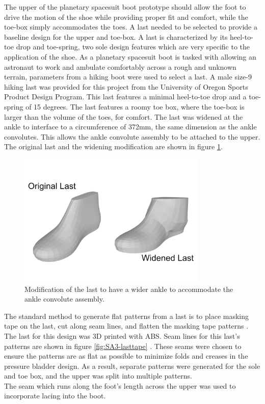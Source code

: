 \documentclass[defaultstyle,11pt]{comps}
\begin{document}
The upper of the planetary spacesuit boot prototype should allow the foot to drive the motion of the shoe while providing proper fit and comfort, while the toe-box simply accommodates the toes.
A last needed to be selected to provide a baseline design for the upper and toe-box.
A last is characterized by its heel-to-toe drop and toe-spring, two sole design features which are very specific to the application of the shoe.
As a planetary spacesuit boot is tasked with allowing an astronaut to work and ambulate comfortably across a rough and unknown terrain, parameters from a hiking boot were used to select a last.
A male size-9 hiking last was provided for this project from the University of Oregon Sports Product Design Program.
This last features a minimal heel-to-toe drop and a toe-spring of 15 degrees.
The last features a roomy toe box, where the toe-box is larger than the volume of the toes, for comfort.
The last was widened at the ankle to interface to a circumference of 372mm, the same dimension as the ankle convolutes.
This allows the ankle convolute assembly to be attached to the upper.
The original last and the widening modification are shown in figure \ref{fig:SA3-lastmod}.

\begin{figure}
\hypertarget{fig:SA3-lastmod}{%
\centering
\includegraphics[width=0.8\textwidth,height=\textheight]{../fig/SA3/LastModification.png}
\caption{Modification of the last to have a wider ankle to accommodate the ankle convolute assembly.}\label{fig:SA3-lastmod}
}
\end{figure}

The standard method to generate flat patterns from a last is to place masking tape on the last, cut along seam lines, and flatten the masking tape patterns \citep{Motawi2020}.
The last for this design was 3D printed with ABS.
Seam lines for this last's patterns are shown in figure \ref{fig:SA3-lasttape} .
These seams were chosen to ensure the patterns are as flat as possible to minimize folds and creases in the pressure bladder design.
As a result, separate patterns were generated for the sole and toe box, and the upper was split into multiple patterns.\\
The seam which runs along the foot's length across the upper was used to incorporate lacing into the boot.
\end{document}
